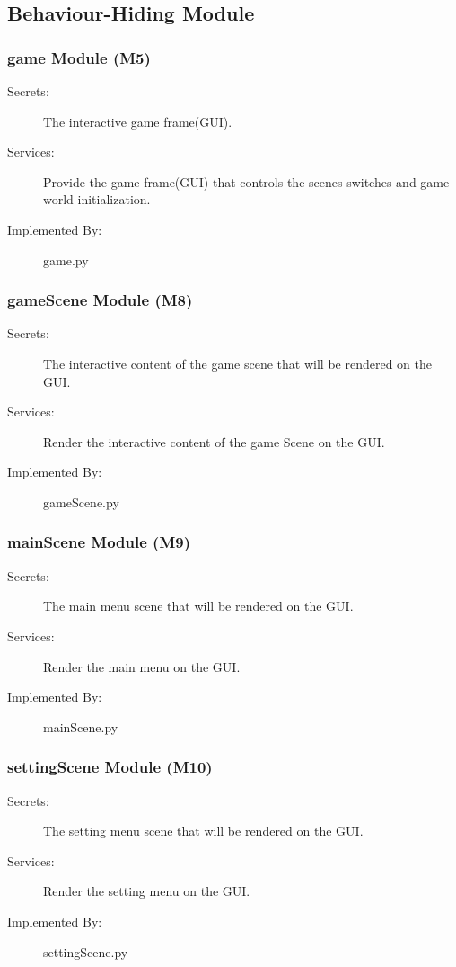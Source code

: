 \documentclass[12pt, titlepage]{article}
\begin{document}
\subsection{Behaviour-Hiding Module}
\subsubsection{game Module (M5)}
\begin{description}
\item[Secrets:]The interactive game frame(GUI).
\item[Services:]Provide the game frame(GUI) that controls the scenes switches and game world initialization.
\item[Implemented By:] game.py
\end{description}

\subsubsection{gameScene Module (M8)}
\begin{description}
\item[Secrets:]The interactive content of the game scene that will be rendered on the GUI.
\item[Services:]Render the interactive content of the game Scene on the GUI.
\item[Implemented By:] gameScene.py
\end{description}

\subsubsection{mainScene Module (M9)}
\begin{description}
\item[Secrets:]The main menu scene that will be rendered on the GUI.
\item[Services:]Render the main menu on the GUI.
\item[Implemented By:] mainScene.py
\end{description}

\subsubsection{settingScene Module (M10)}
\begin{description}
\item[Secrets:]The setting menu scene that will be rendered on the GUI.
\item[Services:]Render the setting menu on the GUI.
\item[Implemented By:] settingScene.py
\end{description}
\end{document}

